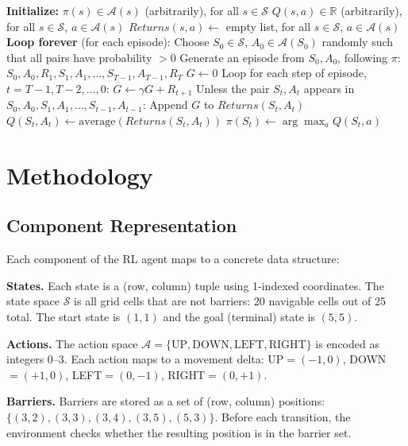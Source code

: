 \documentclass[letterpaper]{article}
\begin{document}
\begin{algorithm}[t]
\caption{Monte Carlo ES (Exploring Starts), for estimating $\pi \approx \pi_*$}
\label{alg:mces}
\begin{algorithmic}[1]
\STATE \textbf{Initialize:}
\STATE \quad $\pi(s) \in \mathcal{A}(s)$ (arbitrarily), for all $s \in \mathcal{S}$
\STATE \quad $Q(s,a) \in \mathbb{R}$ (arbitrarily), for all $s \in \mathcal{S}$, $a \in \mathcal{A}(s)$
\STATE \quad $Returns(s,a) \leftarrow$ empty list, for all $s \in \mathcal{S}$, $a \in \mathcal{A}(s)$
\STATE
\STATE \textbf{Loop forever} (for each episode):
\STATE \quad Choose $S_0 \in \mathcal{S}$, $A_0 \in \mathcal{A}(S_0)$ randomly such that all pairs have probability $> 0$
\STATE \quad Generate an episode from $S_0, A_0$, following $\pi$: $S_0, A_0, R_1, S_1, A_1, \ldots, S_{T-1}, A_{T-1}, R_T$
\STATE \quad $G \leftarrow 0$
\STATE \quad Loop for each step of episode, $t = T{-}1, T{-}2, \ldots, 0$:
\STATE \qquad $G \leftarrow \gamma G + R_{t+1}$
\STATE \qquad Unless the pair $S_t, A_t$ appears in $S_0, A_0, S_1, A_1, \ldots, S_{t-1}, A_{t-1}$:
\STATE \qquad \quad Append $G$ to $Returns(S_t, A_t)$
\STATE \qquad \quad $Q(S_t, A_t) \leftarrow \text{average}(Returns(S_t, A_t))$
\STATE \qquad \quad $\pi(S_t) \leftarrow \arg\max_a Q(S_t, a)$
\end{algorithmic}
\end{algorithm}

\section{Methodology}

\subsection{Component Representation}

Each component of the RL agent maps to a concrete data structure:

\textbf{States.} Each state is a (row, column) tuple using 1-indexed coordinates. The state space $\mathcal{S}$ is all grid cells that are not barriers: 20 navigable cells out of 25 total. The start state is $(1,1)$ and the goal (terminal) state is $(5,5)$.

\textbf{Actions.} The action space $\mathcal{A} = \{\text{UP}, \text{DOWN}, \text{LEFT}, \text{RIGHT}\}$ is encoded as integers 0--3. Each action maps to a movement delta: UP$=(-1,0)$, DOWN$=(+1,0)$, LEFT$=(0,-1)$, RIGHT$=(0,+1)$.

\textbf{Barriers.} Barriers are stored as a set of (row, column) positions: $\{(3,2), (3,3), (3,4), (3,5), (5,3)\}$. Before each transition, the environment checks whether the resulting position is in the barrier set.
\end{document}
